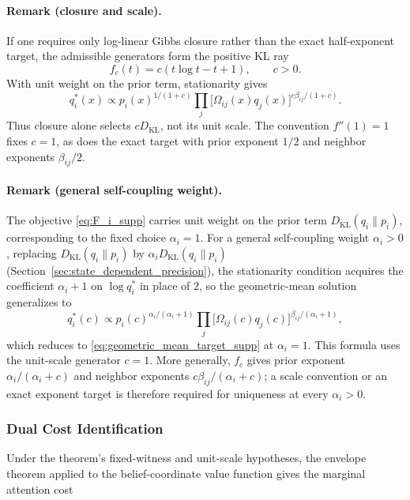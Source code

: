 \documentclass[twoside,11pt]{article}
\begin{document}
\paragraph{Remark (closure and scale).}
If one requires only log-linear Gibbs closure rather than the exact half-exponent target, the admissible generators form the positive KL ray
\begin{equation}
f_c(t)=c(t\log t-t+1), \qquad c>0.
\end{equation}
With unit weight on the prior term, stationarity gives
\begin{equation}
q_i^*(x)\propto p_i(x)^{1/(1+c)}
\prod_j\bigl[\Omega_{ij}(x)q_j(x)\bigr]^{c\beta_{ij}/(1+c)}.
\end{equation}
Thus closure alone selects $cD_{\mathrm{KL}}$, not its unit scale. The convention $f''(1)=1$ fixes $c=1$, as does the exact target with prior exponent $1/2$ and neighbor exponents $\beta_{ij}/2$.

\paragraph{Remark (general self-coupling weight).} The objective \eqref{eq:F_i_supp} carries unit weight on the prior term $D_{\mathrm{KL}}(q_i \| p_i)$, corresponding to the fixed choice $\alpha_i=1$. For a general self-coupling weight $\alpha_i > 0$, replacing $D_{\mathrm{KL}}(q_i \| p_i)$ by $\alpha_i D_{\mathrm{KL}}(q_i \| p_i)$ (Section~\ref{sec:state_dependent_precision}), the stationarity condition acquires the coefficient $\alpha_i + 1$ on $\log q_i^*$ in place of $2$, so the geometric-mean solution generalizes to
\begin{equation}
q_i^*(c) \propto p_i(c)^{\alpha_i/(\alpha_i + 1)} \prod_{j}\bigl[\Omega_{ij}(c) q_j(c)\bigr]^{\beta_{ij}/(\alpha_i + 1)},
\end{equation}
which reduces to \eqref{eq:geometric_mean_target_supp} at $\alpha_i = 1$. This formula uses the unit-scale generator $c=1$. More generally, $f_c$ gives prior exponent $\alpha_i/(\alpha_i+c)$ and neighbor exponents $c\beta_{ij}/(\alpha_i+c)$; a scale convention or an exact exponent target is therefore required for uniqueness at every $\alpha_i>0$.

\subsubsection{Dual Cost Identification}
Under the theorem's fixed-witness and unit-scale hypotheses, the envelope theorem applied to the belief-coordinate value function gives the marginal attention cost
\end{document}
